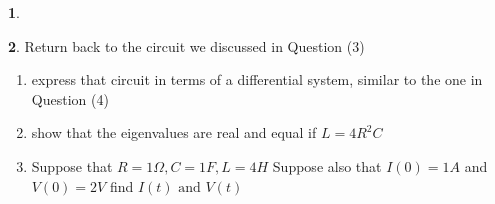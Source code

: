 \documentclass[11pt]{article}
\theoremstyle{definition}
\newtheorem{q}{}
\begin{document}
\begin{multicols*}{2}
\begin{q}
\begin{enumerate}
			\end{enumerate}
		\end{q}
		\begin{q}
			Return back to the circuit we discussed in Question (3)
			\begin{enumerate}
				\item express that circuit in terms of a differential system, similar to the one in Question (4)
				\item show that the eigenvalues are real and equal if $ L = 4R^2C $ 
				\item Suppose that $ R = 1 \Omega, C = 1 F, L = 4H$ Suppose also that $ I(0) = 1 A $ and $ V(0) = 2V $ find $ I(t) \text{ and } V(t) $
			\end{enumerate}
			  
		\end{q}
	\end{multicols*}
\end{document}
